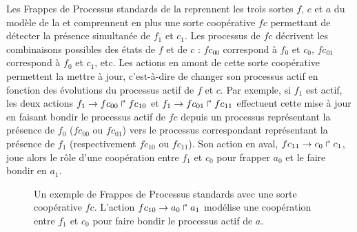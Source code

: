 \begin{example}
  Les Frappes de Processus standards de la 
  reprennent les trois sortes $f$, $c$ et $a$ du modèle de la 
  et comprennent en plus une sorte coopérative $fc$
  permettant de détecter la présence simultanée de $f_1$ et $c_1$.
  Les processus de $fc$ décrivent les combinaisons possibles des états de $f$ et de $c$ :
  $fc_{00}$ correspond à $f_0$ et $c_0$, $fc_{01}$ correspond à $f_0$ et $c_1$, etc.
  Les actions en amont de cette sorte coopérative permettent la mettre à jour,
  c'est-à-dire de changer son processus actif en fonction des évolutions
  du processus actif de $f$ et $c$.
  Par exemple, si $f_1$ est actif, les deux actions
  $f_1\rightarrow fc_{00}\Rsh fc_{10}$ et $f_1\rightarrow fc_{01}\Rsh fc_{11}$
  effectuent cette mise à jour en faisant bondir le processus actif de $fc$ depuis
  un processus représentant la présence de $f_0$ ($fc_{00}$ ou $fc_{01}$)
  vers le processus correspondant représentant la présence de $f_1$
  (respectivement $fc_{10}$ ou $fc_{11}$).
  Son action en aval, $fc_{11}\rightarrow c_0\Rsh c_1$,
  joue alors le rôle d'une coopération entre $f_1$ et $c_0$
  pour frapper $a_0$ et le faire bondir en $a_1$.
  
  \begin{figure}[p]
  \begin{center}\end{center}
  \caption{%
    Un exemple de Frappes de Processus standards
    avec une sorte coopérative $fc$.
    L'action $fc_{10}\rightarrow a_0\Rsh a_1$ modélise
    une coopération entre $f_1$ et $c_0$ pour faire bondir le processus actif de $a$.}
  \end{figure}
\end{example}

